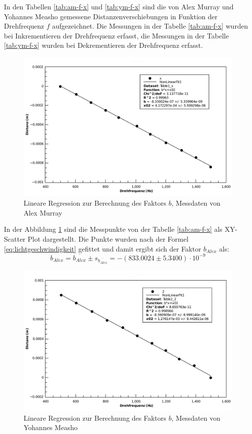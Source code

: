 In den Tabellen \ref{tab:am-f-x} und  \ref{tab:ym-f-x}  sind die von Alex Murray
und   Yohannes   Measho   gemessene  Distanzenverschiebungen  in  Funktion   der
Drehfrequenz  $f$  aufgezeichnet.  Die Messungen in der Tabelle \ref{tab:am-f-x}
wurden bei Inkrementieren der Drehfrequenz erfasst, die Messungen in der Tabelle
\ref{tab:ym-f-x}   wurden   bei   Dekrementieren   der   Drehfrequenz   erfasst.

\begin{figure}[H]
    \center
    \includegraphics[width=.8\textwidth]{images/am-f-x-fit-b.pdf}
    \caption{Lineare Regression zur Berechnung des Faktors $b$, Messdaten von Alex Murray}
    \label{fig:am-f-x-fit-b}
\end{figure}

In  der Abbildung \ref{fig:am-f-x-fit-b} sind die  Messpunkte  von  der  Tabelle
\ref{tab:am-f-x} als  XY-Scatter  Plot  dargestellt.  Die Punkte wurden nach der
Formel \ref{eq:lichtgeschwindigkeit} gefittet und damit ergibt  sich  der Faktor
$b_{Alex}$ als:
\begin{equation}
    b_{Alex} = \overline{b_{Alex}} \pm s_{\overline{b_{Alex}}} = -(833.0024 \pm 5.3400)\cdot 10^{-9}
    \label{eq:am-b}
\end{equation}

\begin{figure}[H]
    \center
    \includegraphics[width=.8\textwidth]{images/ym-f-x-fit-b.pdf}
    \caption{Lineare Regression zur Berechnung des Faktors $b$, Messdaten von Yohannes Measho}
    \label{fig:ym-f-x-fit-b}
\end{figure}

